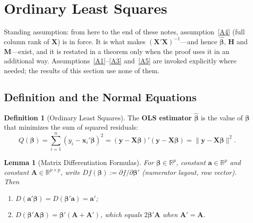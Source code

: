 \documentclass[14pt]{extarticle}
\theoremstyle{plain}
\newtheorem{lemma}[theorem]{Lemma}
\theoremstyle{definition}
\newtheorem{definition}[theorem]{Definition}
\theoremstyle{remark}
\newcommand{\bX}{\mathbf{X}}
\newcommand{\by}{\mathbf{y}}
\newcommand{\bx}{\mathbf{x}}
\def\bb{\boldsymbol{\beta}}
\newcommand{\bH}{\mathbf{H}}
\newcommand{\bM}{\mathbf{M}}
\newcommand{\bA}{\mathbf{A}}
\newcommand{\ba}{\mathbf{a}}
\newcommand{\Real}{\mathbb{R}}
\begin{document}
\section{Ordinary Least Squares}\label{sec:ols}

Standing assumption: from here to the end of these notes, assumption~\ref{A4} (full column rank of $\bX$) is in force. It is what makes $(\bX'\bX)^{-1}$---and hence $\hat{\bb}$, $\bH$ and $\bM$---exist, and it is restated in a theorem only when the proof uses it in an additional way. Assumptions~\ref{A1}--\ref{A3} and~\ref{A5} are invoked explicitly where needed; the results of this section use none of them.

\subsection{Definition and the Normal Equations}

\begin{definition}[Ordinary Least Squares]\label{def:ols}
The \textbf{OLS estimator} $\hat{\bb}$ is the value of $\bb$ that minimizes the sum of squared residuals:
\begin{equation}
Q(\bb) = \sum_{i=1}^{n}(y_i - \bx_i'\bb)^2 = (\by - \bX\bb)'(\by - \bX\bb) = \|\by - \bX\bb\|^2.
\end{equation}
\end{definition}

\begin{lemma}[Matrix Differentiation Formulas]\label{lem:matrix-diff}
For $\bb \in \Real^p$, constant $\ba \in \Real^p$ and constant $\bA \in \Real^{p\times p}$, write $Df(\bb) := \partial f/\partial\bb'$ (numerator layout, row vector). Then
\begin{enumerate}[label=\textup{(\roman*)}]
\item $D(\ba'\bb) = D(\bb'\ba) = \ba'$;
\item $D(\bb'\bA\bb) = \bb'(\bA + \bA')$, which equals $2\bb'\bA$ when $\bA' = \bA$.
\end{enumerate}
\end{lemma}
\end{document}
